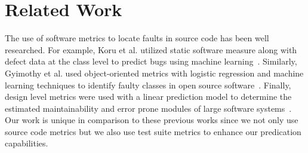 \section{Related Work}
\label{sec:approach_related_work}
The use of software metrics to locate faults in source code has been well researched. For example, Koru et al. utilized static software measure along with defect data at the class level to predict bugs using machine learning~\cite{KL05}. Similarly, Gyimothy et al. used object-oriented metrics with logistic regression and machine learning techniques to identify faulty classes in open source software~\cite{GFS05}. Finally, design level metrics were used with a linear prediction model to determine the estimated maintainability and error prone modules of large software systems~\cite{MKPS00}. Our work is unique in comparison to these previous works since we not only use source code metrics but we also use test suite metrics to enhance our predication capabilities.
